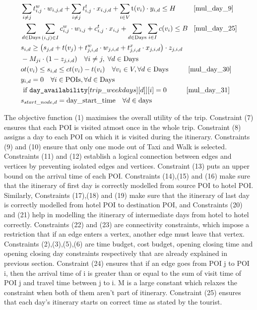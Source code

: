 \documentclass[sigconf,authordraft]{acmart}
\begin{document}
\begin{align}
    & \sum_{i \ne j} t^{w}_{i,j} \cdot w_{i,j,d} + \sum_{i \ne j} t^{t}_{i,j} \cdot x_{i,j,d} + \sum_{i \in V} \text{t}(v_i) \cdot y_{i,d} \nonumber \leq H \hspace{0.9cm} \ref{mul_day_9}\\
    & \sum_{d \in \text{Days}} \sum_{(i,j) \in I} c^{w}_{i,j} \cdot w_{i,j} + c^{t}_{i,j} \cdot x_{i,j} + \sum_{d \in \text{Days}} \sum_{i \in I} c(v_i) \leq B \hspace{0.3cm} \ref{mul_day_25} \notag\\
    & s_{i,d} \geq \left( s_{j,d} + t(v_j) + t^{w}_{j,i,d} \cdot w_{j,i,d} + t^{x}_{j,i,d} \cdot x_{j,i,d} \right) \cdot z_{j,i,d} \notag\\
    &- M_{ji} \cdot (1 - z_{j,i,d}) \quad\forall i \neq j,\; \forall d \in \text{Days} \\
    & ot(v_i) \leq s_{i,d} \leq ct(v_i) - t(v_i) \quad \forall v_i \in V, \forall d \in \text{Days} \hspace{1cm}\ref{mul_day_30} \notag\\
    & y_{i,d} = 0 \quad \forall i \in \text{POIs}, \forall d \in \text{Days} \notag \\& \text{ if } \texttt{day\_availability}[trip\_weekdays][d]][i] = 0 \hspace{1cm}\ref{mul_day_31} \notag\\
    & s_{start\_node,d} = \text{day\_start\_time} \quad \forall d \in \text{days}
\end{align}

The objective function (1) maximises the overall utility of the trip. Constraint (7) ensures that each POI is visited atmost once in the whole trip. Constraint (8) assigns a day to each POI on which it is visited during the itinerary. Constraints (9) and (10) ensure that only one mode out of Taxi and Walk is selected. Constraints (11) and (12) establish a logical connection between edges and vertices by preventing isolated edges and vertices. Constraint (13) puts an upper bound on the arrival time of each POI. Constraints (14),(15) and (16) make sure that the itinerary of first day is correctly modelled from source POI to hotel POI. Similarly, Constraints (17),(18) and (19) make sure that the itinerary of last day is correctly modelled from hotel POI to destination POI, and Constraints (20) and (21) help in modelling the itinerary of intermediate days from hotel to hotel correctly. Constraints (22) and (23) are connectivity constraints, which impose a restriction that if an edge enters a vertex, another edge must leave that vertex. Constraints (2),(3),(5),(6) are time budget, cost budget, opening closing time and opening closing day constraints respectively that are already explained in previous section. Constraint (24) ensures that if an edge goes from POI j to POI i, then the arrival time of i is greater than or equal to the sum of visit time of POI j and travel time between j to i. M is a large constant which relaxes the constraint when both of them aren't part of itinerary. Constraint (25) ensures that each day's itinerary starts on correct time as stated by the tourist.
\end{document}
